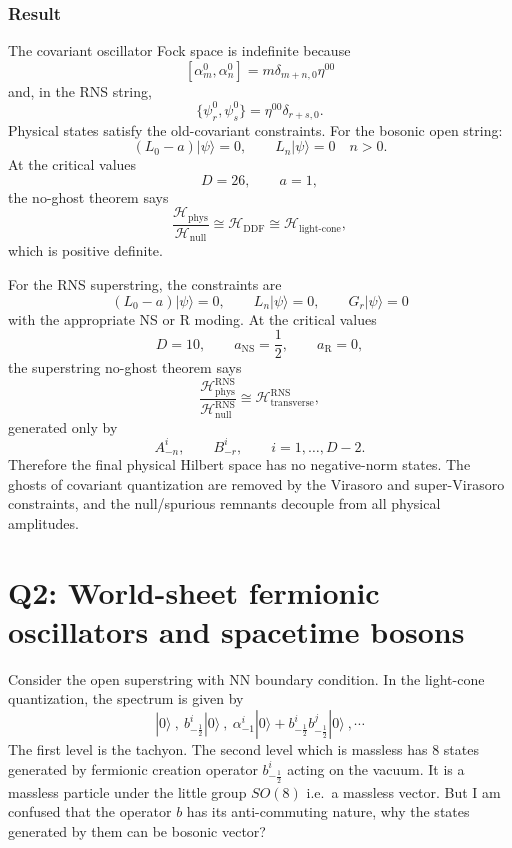 \documentclass[
  10pt,
  a4paper,
  openany]{book}
\begin{document}
\subsubsection{Result}\label{result-12}

The covariant oscillator Fock space is indefinite because \[
[\alpha_m^0,\alpha_n^0]
=
m\delta_{m+n,0}\eta^{00}
\] and, in the RNS string, \[
\{\psi_r^0,\psi_s^0\}
=
\eta^{00}\delta_{r+s,0}.
\] Physical states satisfy the old-covariant constraints. For the
bosonic open string: \[
(L_0-a)|\psi\rangle=0,
\qquad
L_n|\psi\rangle=0
\quad
n>0.
\] At the critical values \[
D=26,
\qquad
a=1,
\] the no-ghost theorem says \[
\frac{\mathcal H_{\text{phys}}}{\mathcal H_{\text{null}}}
\cong
\mathcal H_{\text{DDF}}
\cong
\mathcal H_{\text{light-cone}},
\] which is positive definite.

For the RNS superstring, the constraints are \[
(L_0-a)|\psi\rangle=0,
\qquad
L_n|\psi\rangle=0,
\qquad
G_r|\psi\rangle=0
\] with the appropriate NS or R moding. At the critical values \[
D=10,
\qquad
a_{\text{NS}}=\frac{1}{2},
\qquad
a_{\text{R}}=0,
\] the superstring no-ghost theorem says \[
\frac{\mathcal H_{\text{phys}}^{\text{RNS}}}
{\mathcal H_{\text{null}}^{\text{RNS}}}
\cong
\mathcal H_{\text{transverse}}^{\text{RNS}},
\] generated only by \[
A_{-n}^i,
\qquad
B_{-r}^i,
\qquad
i=1,\dots,D-2.
\] Therefore the final physical Hilbert space has no negative-norm
states. The ghosts of covariant quantization are removed by the Virasoro
and super-Virasoro constraints, and the null/spurious remnants decouple
from all physical amplitudes.

\section{Q2: World-sheet fermionic oscillators and spacetime
bosons}\label{q2-world-sheet-fermionic-oscillators-and-spacetime-bosons}

Consider the open superstring with NN boundary condition. In the
light-cone quantization, the spectrum is given by \[
|0\rangle \ , \ b^i_{-\frac{1}{2}}|0\rangle \ , \ \alpha_{-1}^i|0\rangle+b^i_{-\frac{1}{2}}b^j_{-\frac{1}{2}}|0\rangle\ ,\cdots
\] The first level is the tachyon. The second level which is massless
has 8 states generated by fermionic creation operator
\(b_{-\frac{1}{2}}^i\) acting on the vacuum. It is a massless particle
under the little group \(SO(8)\) i.e.~a massless vector. But I am
confused that the operator \(b\) has its anti-commuting nature, why the
states generated by them can be bosonic vector?
\end{document}
